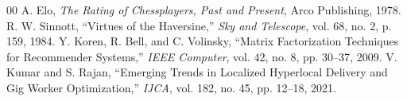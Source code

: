 \documentclass[conference]{IEEEtran}
\begin{document}
\begin{thebibliography}{00}
 A. Elo, \textit{The Rating of Chessplayers, Past and Present}, Arco Publishing, 1978.
 R. W. Sinnott, ``Virtues of the Haversine,'' \textit{Sky and Telescope}, vol. 68, no. 2, p. 159, 1984.
 Y. Koren, R. Bell, and C. Volinsky, ``Matrix Factorization Techniques for Recommender Systems,'' \textit{IEEE Computer}, vol. 42, no. 8, pp. 30--37, 2009.
 V. Kumar and S. Rajan, ``Emerging Trends in Localized Hyperlocal Delivery and Gig Worker Optimization,'' \textit{IJCA}, vol. 182, no. 45, pp. 12--18, 2021.
\end{thebibliography}
\end{document}
